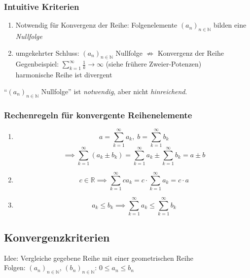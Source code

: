 \subsubsection*{Intuitive Kriterien}

\begin{enumerate}
    \item Notwendig für Konvergenz der Reihe: Folgenelemente $(a_n)_{n \in \mathbb{N}}$ bilden eine \emph{Nullfolge}
    \item umgekehrter Schluss: $(a_n)_{n \in \mathbb{N}}$ Nullfolge $\not\Rightarrow$ Konvergenz der Reihe\\
        Gegenbeispiel: $\sum_{k=1}^{\infty} \frac{1}{k} \rightarrow \infty $ (siehe frühere Zweier-Potenzen) \\
        harmonische Reihe ist divergent
\end{enumerate}

\begin{note}
    "`$(a_n)_{n \in \mathbb{N}}$ Nullfolge"' ist \emph{notwendig}, aber nicht \emph{hinreichend}.
\end{note}

\subsubsection*{Rechenregeln für konvergente Reihenelemente}
\begin{enumerate}
    \item \begin{equation*} a = \sum_{k=1}^{\infty} a_k,\; b = \sum_{k=1}^{\infty} b_k \end{equation*}
        \begin{equation*}\implies \sum_{k = 1}^{\infty} \left( a_k \pm b_k \right) = \sum_{k=1}^{\infty} a_k \pm \sum_{k=1}^{\infty} b_k = a \pm b
        \end{equation*}
    \item \begin{equation*}c \in \mathbb{R} \implies \sum_{k=1}^{\infty} c a_k = c \cdot\sum_{k=1}^{\infty} a_k = c \cdot a \end{equation*}
    \item \begin{equation*}a_k \leq b_k \implies \sum_{k=1}^{\infty} a_k \leq \sum_{k=1}^{\infty} b_k \end{equation*}
\end{enumerate}

\subsection{Konvergenzkriterien}
Idee: Vergleiche gegebene Reihe mit einer geometrischen Reihe\\
Folgen: $ (a_n)_{n \in \mathbb{N}} $, $ (b_n)_{n \in \mathbb{N}} $: $ 0 \leq a_n \leq b_n$

